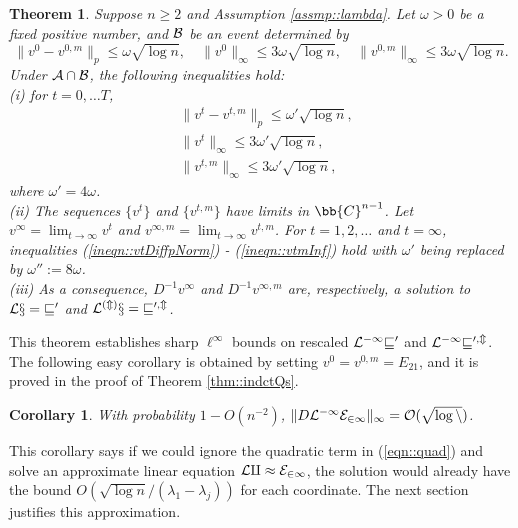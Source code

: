 \documentclass[12pt]{article}%
\theoremstyle{plain}%
\newtheorem{thm}{Theorem}[section]
\newtheorem{cor}{Corollary}[section]
\theoremstyle{remark}
\begin{document}
\begin{thm}\label{thm::indctL}
Suppose $n \ge 2$ and Assumption \ref{assmp::lambda}. Let $\omega > 0$ be a fixed positive number, and $\cal{B}$ be an event determined by
\begin{equation*}
\| v^0 - v^{0,m} \|_{p} \le \omega \sqrt{\log n}, \quad \| v^0 \|_{\infty} \le 3\omega \sqrt{\log n}, \quad \| v^{0,m} \|_{\infty} \le 3\omega \sqrt{\log n}.
\end{equation*}
Under $\cal{A} \cap \cal{B}$, the following inequalities hold: \\
(i) for $t = 0,\ldots T$,
\begin{align}
&\| v^t - v^{t,m} \|_{p} \le \omega' \sqrt{\log n}, \label{ineqn::vtDiffpNorm}\\
& \| v^t \|_{\infty} \le 3\omega' \sqrt{\log n}, \label{ineqn::vtInf}\\
 &\| v^{t,m} \|_{\infty} \le 3\omega' \sqrt{\log n}, \label{ineqn::vtmInf}
\end{align}
where $\omega' = 4\omega$. \\
(ii) The sequences $\{ v^t \}$ and $\{ v^{t,m} \}$ have limits in $\bb{C}^{n-1}$. Let $v^\infty = \lim_{t \to \infty} v^t$ and $v^{\infty,m} = \lim_{t \to \infty} v^{t,m}$. For $t=1,2,\ldots$ and $t = \infty$, inequalities (\ref{ineqn::vtDiffpNorm}) - (\ref{ineqn::vtmInf}) hold with $\omega'$ being replaced by $\omega'' := 8\omega$.\\
(iii) As a consequence, $D^{-1}v^{\infty}$ and $D^{-1}v^{\infty,m}$ are, respectively, a solution to $\cal{L}x = v^0$ and $\cal{L}^{(m)}x = v^{0,m}$.
\end{thm}

This theorem establishes sharp $\ell^\infty$ bounds on rescaled $\cal{L}^{-1}v^0$ and $\cal{L}^{-1}v^{0,m}$. The following easy corollary is obtained by setting $v^0 = v^{0,m} = E_{21}$, and it is proved in the proof of Theorem \ref{thm::indctQs}.

\begin{cor}\label{cor::L-1E21}
With probability $1 - O(n^{-2})$, $\| D \cal{L}^{-1} E_{21} \|_{\infty} = O( \sqrt{\log n} )$.
\end{cor}

This corollary says if we could ignore the quadratic term in (\ref{eqn::quad}) and solve an approximate linear equation $\cal{L} q \approx E_{21}$, the solution would already have the bound $O(\sqrt{\log n}/(\lambda_1 - \lambda_j))$ for each coordinate. The next section justifies this approximation.
\end{document}
